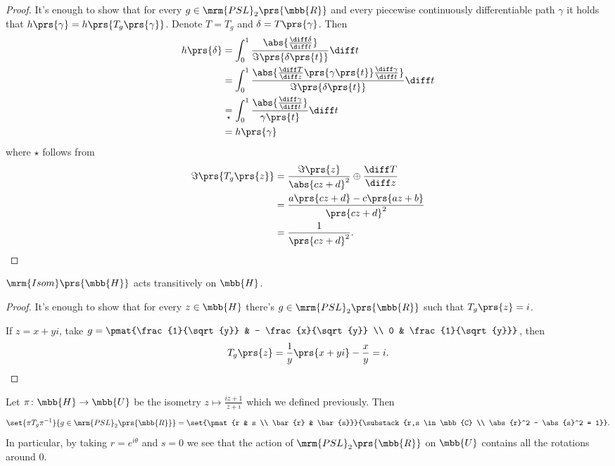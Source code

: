 \documentclass[10pt, twoside]{book}
\begin{document}
\begin{proof}
It's enough to show that for every $g \in \mrm{PSL}_2\prs{\mbb{R}}$ and every piecewise continuously differentiable path $\gamma$ it holds that $h\prs{\gamma} = h\prs{T_g\prs{\gamma}}$.
Denote $T = T_g$ and $\delta = T\prs{\gamma}$. Then
\begin{align*}
h\prs{\delta} &= \int_0^1 \frac{\abs{\frac{\diff \delta}{\diff t}}}{\Im\prs{\delta\prs{t}}} \diff t
\\&=
\int_0^1 \frac{\abs{\frac{\diff T}{\diff z} \prs{\gamma\prs{t}} \frac{\diff \gamma}{\diff t}}}{\Im\prs{\delta\prs{t}}} \diff t
\\&\underset{\star}{=}
\int_0^1 \frac{\abs{\frac{\diff \gamma}{\diff t}}}{\gamma\prs{t}} \diff t
\\&=
h\prs{\gamma}
\end{align*}
where $\star$ follows from
\begin{align*}
\Im\prs{T_g\prs{z}} &= \frac{\Im \prs{z}}{\abs{cz + d}^2} \oplus \frac{\diff T}{\diff z} \\&=
\frac{a\prs{cz + d} - c\prs{az + b}}{\prs{cz + d}^2}
\\&= \frac{1}{\prs{cz + d}^2} \text{.}
\end{align*}
\end{proof}

\begin{corollary}
$\mrm{Isom}\prs{\mbb{H}}$ acts transitively on $\mbb{H}$.
\end{corollary}

\begin{proof}
It's enough to show that for every $z \in \mbb{H}$ there's $g \in \mrm{PSL}_2\prs{\mbb{R}}$ such that $T_g\prs{z} = i$.

If $z = x + yi$, take $g = \pmat{\frac{1}{\sqrt{y}} & - \frac{x}{\sqrt{y}} \\ 0 & \frac{1}{\sqrt{y}}}$, then
\[T_g\prs{z} = \frac{1}{y} \prs{x + yi} - \frac{x}{y} = i \text{.}\]
\end{proof}

\begin{lemma}
Let $\pi \colon \mbb{H} \to \mbb{U}$ be the isometry $z \mapsto \frac{iz + 1}{z + i}$ which we defined previously.
Then
\[\set{\pi T_g \pi^{-1}}{g \in \mrm{PSL}_2\prs{\mbb{R}}} = \set{\pmat{r & s \\ \bar{r} & \bar{s}}}{\substack{r,s \in \mbb{C} \\ \abs{r}^2 - \abs{s}^2 = 1}} \text{.}\]
In particular, by taking $r = e^{i \theta}$ and $s = 0$ we see that the action of $\mrm{PSL}_2\prs{\mbb{R}}$ on $\mbb{U}$ contains all the rotations around $0$.
\end{lemma}
\end{document}
